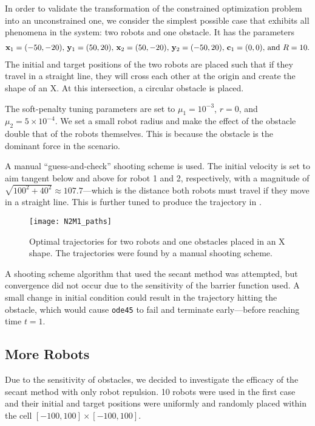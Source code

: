 \documentclass[11pt]{article}
\begin{document}
In order to validate the transformation of the constrained optimization problem into an unconstrained one, we consider the simplest possible case that exhibits all phenomena in the system: two robots and one obstacle. It has the parameters
\begin{align*}
	\mathbf{x}_1 = (-50,-20),\,\mathbf{y}_1 = (50,20),\,\mathbf{x}_2 = (50,-20),\,\mathbf{y}_2 = (-50,20),\,\mathbf{c}_1 = (0,0),\, \text{and } R = 10.
\end{align*}
The initial and target positions of the two robots are placed such that if they travel in a straight line, they will cross each other at the origin and create the shape of an X. At this intersection, a circular obstacle is placed.

The soft-penalty tuning parameters are set to \(\mu_1 = 10^{-3}\), \(r = 0\), and \(\mu_2 = 5 \times 10^{-4}\). We set a small robot radius and make the effect of the obstacle double that of the robots themselves. This is because the obstacle is the dominant force in the scenario.

A manual ``guess-and-check'' shooting scheme is used. The initial velocity is set to aim tangent below and above for robot 1 and 2, respectively, with a magnitude of \(\sqrt{100^2 + 40^2} \approx 107.7\)---which is the distance both robots must travel if they move in a straight line. This is further tuned to produce the trajectory in .

\begin{figure}
	\centering
	\texttt{[image: N2M1\_paths]}
	\caption{Optimal trajectories for two robots and one obstacles placed in an X shape. The trajectories were found by a manual shooting scheme.}
	\label{fig:n2m1-paths}
\end{figure}

A shooting scheme algorithm that used the secant method was attempted, but convergence did not occur due to the sensitivity of the barrier function used. A small change in initial condition could result in the trajectory hitting the obstacle, which would cause \texttt{ode45} to fail and terminate early---before reaching time \(t = 1\).

\subsection{More Robots}

Due to the sensitivity of obstacles, we decided to investigate the efficacy of the secant method with only robot repulsion. 10 robots were used in the first case and their initial and target positions were uniformly and randomly placed within the cell \([-100,100] \times [-100,100]\).
\end{document}
